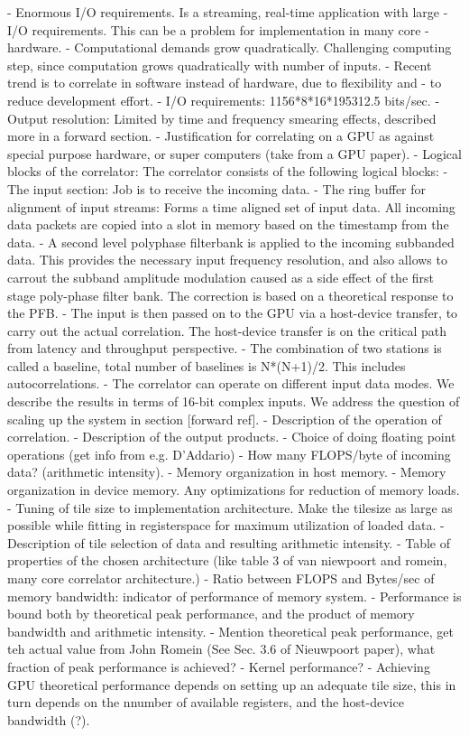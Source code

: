 \documentclass{aa}
\begin{document}
- Enormous I/O  requirements. Is a  streaming, real-time application  with large
- I/O  requirements. This  can  be a  problem for  implementation  in many  core
- hardware.   
- Computational demands  grow  quadratically. Challenging  computing step, since  
  computation grows  quadratically with  number of  inputs.
- Recent trend is to correlate in software  instead of hardware, due to flexibility and
- to reduce development effort.
- I/O requirements: 1156*8*16*195312.5 bits/sec.
- Output resolution: Limited by time and frequency smearing effects, described more in a forward section.
- Justification for correlating on a GPU as against special purpose hardware, or super computers (take from a GPU paper).
- Logical blocks of the correlator:
The correlator consists of the following logical blocks:
- The input section: Job is to receive the incoming data.
- The ring buffer for alignment of input streams: Forms a time aligned set of input data. All incoming data packets are copied into a slot in memory based on the timestamp from the data.
- A second level polyphase filterbank is applied to the incoming subbanded data. This provides the necessary input frequency resolution, and also allows to carrout the subband amplitude modulation caused as a side effect of the first stage poly-phase filter bank. The correction is based on a theoretical response to the PFB.
- The input is then passed on to the GPU via a host-device transfer, to carry out the actual correlation. The host-device transfer is on the critical path from latency and throughput perspective.
- The combination of two stations is called a baseline, total number of baselines is N*(N+1)/2. This includes autocorrelations.
- The correlator can operate on different input data modes. We describe the results in terms of 16-bit complex inputs. We address the question of scaling up the system in section [forward ref].
- Description of the operation of correlation.
- Description of the output products.
- Choice of doing floating point operations (get info from e.g. D'Addario)
- How many FLOPS/byte of incoming data? (arithmetic intensity).
- Memory organization in host memory.
- Memory organization in device memory. Any optimizations for reduction of memory loads.
- Tuning of tile size to implementation architecture. Make the tilesize as large as possible while fitting in registerspace for maximum utilization of loaded data.
- Description of tile selection of data and resulting arithmetic intensity.
- Table of properties of the chosen architecture (like table 3 of van niewpoort and romein, many core correlator architecture.)
- Ratio between FLOPS and Bytes/sec of memory bandwidth: indicator of performance of memory system.
- Performance is bound both by theoretical peak performance, and the product of memory bandwidth and arithmetic intensity.
- Mention theoretical peak performance, get teh actual value from John Romein (See Sec. 3.6 of Nieuwpoort paper), what fraction of peak performance is achieved?
- Kernel performance?
- Achieving GPU theoretical performance depends on setting up an adequate tile size, this in turn depends on the nnumber of available registers, and the host-device bandwidth (?).
\end{document}
